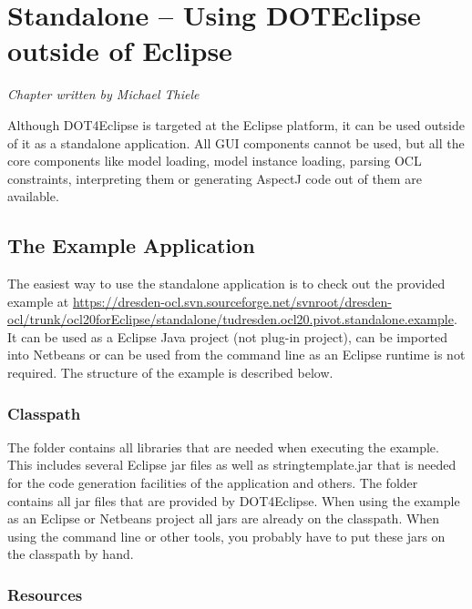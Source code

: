 \chapter{Standalone -- Using \acl{DOTEclipse} outside of Eclipse}
\label{chapter:standalone}
\lstset{language=Java}

\begin{flushright}
\textit{Chapter written by Michael Thiele}
\end{flushright}

Although \acl{DOT4Eclipse} is targeted at the Eclipse platform, it can be used outside of it as a standalone application. All GUI components cannot be used, but all the core components like model loading, model instance loading, parsing OCL constraints, interpreting them or generating AspectJ code out of them are available.


\section{The Example Application}

The easiest way to use the standalone application is to check out the provided example at \url{https://dresden-ocl.svn.sourceforge.net/svnroot/dresden-ocl/trunk/ocl20forEclipse/standalone/tudresden.ocl20.pivot.standalone.example}. It can be used as a Eclipse Java project (not plug-in project), can be imported into Netbeans or can be used from the command line as an Eclipse runtime is not required. The structure of the example is described below.


\subsection{Classpath}

The  folder contains all libraries that are needed when executing the example. This includes several Eclipse jar files as well as stringtemplate.jar that is needed for the code generation facilities of the application and others. The  folder contains all jar files that are provided by \acl{DOT4Eclipse}. When using the example as an Eclipse or Netbeans project all jars are already on the classpath. When using the command line or other tools, you probably have to put these jars on the classpath by hand.


\subsection{Resources}

